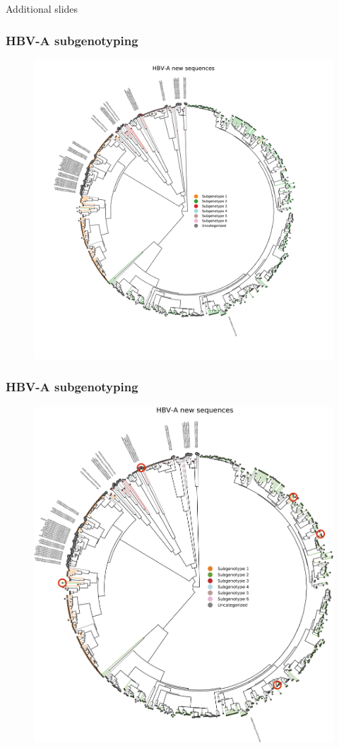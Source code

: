 \documentclass{beamer}
\begin{document}

\appendix

%
\begin{frame}
  \Huge{\centerline{Additional slides}}
\end{frame}


\begin{frame}
  \frametitle{HBV-A subgenotyping}
  \begin{figure}
    \includegraphics[width=.6\linewidth]{image/results/HBV-A_new_sequences}
  \end{figure}
\end{frame}


\begin{frame}
  \frametitle{HBV-A subgenotyping}
  \begin{figure}
    \includegraphics[width=.6\linewidth]{image/results/HBV-A_new_sequences_with_highlights.png}
  \end{figure}
\end{frame}
\end{document}
